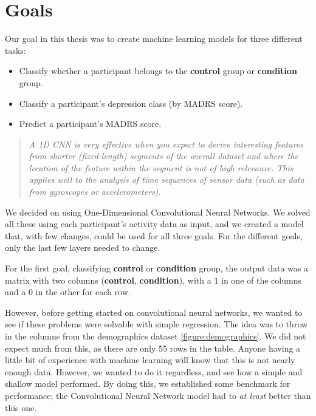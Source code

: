 \section{Goals}

Our goal in this thesis was to create machine learning models for three different tasks:

\begin{itemize}
  \item Classify whether a participant belongs to the \textbf{control} group or \textbf{condition} group.
  \item Classify a participant's depression class (by MADRS score).
  \item Predict a participant's MADRS score.
\end{itemize}


\begin{quote}
  \textit{A 1D CNN is very effective when you expect to derive interesting features from shorter (fixed-length) segments of the overall dataset and where the location of the feature within the segment is not of high relevance. This applies well to the analysis of time sequences of sensor data (such as data from gyroscopes or accelerometers).} \cite{1d_cnn}
\end{quote}

We decided on using One-Dimensional Convolutional Neural Networks. We solved all these using each participant's activity data as input, and we created a model that, with few changes, could be used for all three goals. For the different goals, only the last few layers needed to change. 

For the first goal, classifying \textbf{control} or \textbf{condition} group, the output data was a matrix with two columns (\textbf{control}, \textbf{condition}), with a $1$ in one of the columns and a $0$ in the other for each row. 

However, before getting started on convolutional neural networks, we wanted to see if these problems were solvable with simple regression. The idea was to throw in the columns from the demographics dataset \ref{figure:demographics}. We did not expect much from this, as there are only 55 rows in the table. Anyone having a little bit of experience with machine learning will know that this is not nearly enough data. However, we wanted to do it regardless, and see how a simple and shallow model performed. By doing this, we established some benchmark for performance; the Convolutional Neural Network model had to \textit{at least} better than this one.

